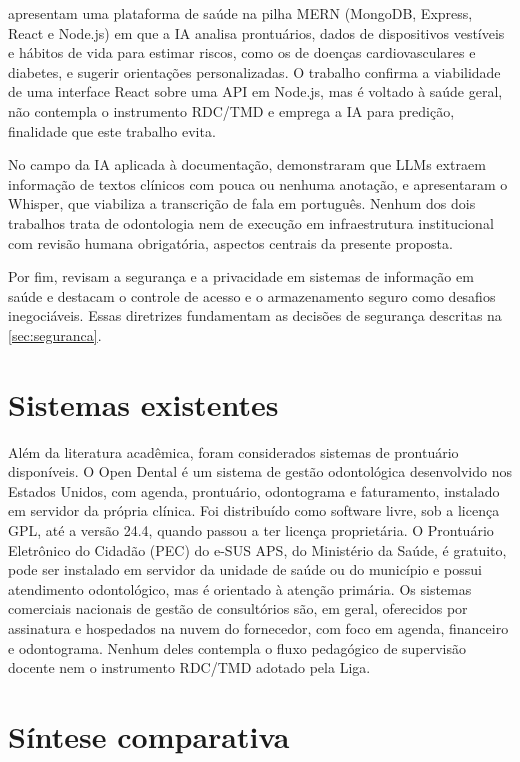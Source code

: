  apresentam uma plataforma de saúde na pilha MERN (MongoDB, Express, React e Node.js) em que a IA analisa prontuários, dados de dispositivos vestíveis e hábitos de vida para estimar riscos, como os de doenças cardiovasculares e diabetes, e sugerir orientações personalizadas. O trabalho confirma a viabilidade de uma interface React sobre uma API em Node.js, mas é voltado à saúde geral, não contempla o instrumento RDC/TMD e emprega a IA para predição, finalidade que este trabalho evita.

No campo da IA aplicada à documentação,  demonstraram que LLMs extraem informação de textos clínicos com pouca ou nenhuma anotação, e  apresentaram o Whisper, que viabiliza a transcrição de fala em português. Nenhum dos dois trabalhos trata de odontologia nem de execução em infraestrutura institucional com revisão humana obrigatória, aspectos centrais da presente proposta.

Por fim,  revisam a segurança e a privacidade em sistemas de informação em saúde e destacam o controle de acesso e o armazenamento seguro como desafios inegociáveis. Essas diretrizes fundamentam as decisões de segurança descritas na \autoref{sec:seguranca}.

\section{Sistemas existentes}

Além da literatura acadêmica, foram considerados sistemas de prontuário disponíveis. O Open Dental é um sistema de gestão odontológica desenvolvido nos Estados Unidos, com agenda, prontuário, odontograma e faturamento, instalado em servidor da própria clínica. Foi distribuído como software livre, sob a licença GPL, até a versão 24.4, quando passou a ter licença proprietária. O Prontuário Eletrônico do Cidadão (PEC) do e-SUS APS, do Ministério da Saúde, é gratuito, pode ser instalado em servidor da unidade de saúde ou do município e possui atendimento odontológico, mas é orientado à atenção primária. Os sistemas comerciais nacionais de gestão de consultórios são, em geral, oferecidos por assinatura e hospedados na nuvem do fornecedor, com foco em agenda, financeiro e odontograma. Nenhum deles contempla o fluxo pedagógico de supervisão docente nem o instrumento RDC/TMD adotado pela Liga.

\section{Síntese comparativa}

